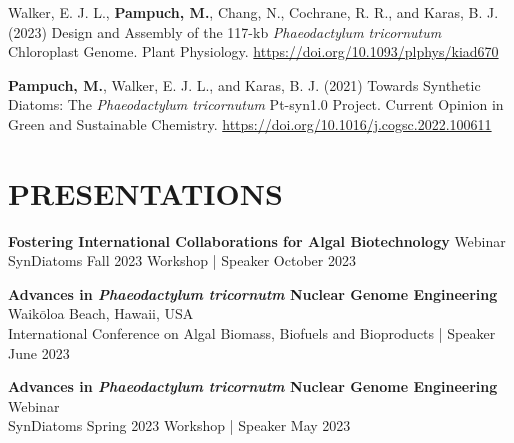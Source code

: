 \documentclass[a4paper,9pt]{extarticle}
\begin{document}
\noindent
\begin{minipage}{1\textwidth}
\setlength{\parindent}{15pt} %
	\noindent
	Walker, E. J. L., \textbf{Pampuch, M.}, Chang, N., Cochrane, R. R., and Karas, B. J. (2023) Design and Assembly of the 117-kb \textit{Phaeodactylum tricornutum} Chloroplast Genome. Plant Physiology. \href{https://doi.org/10.1093/plphys/kiad670}{https://doi.org/10.1093/plphys/kiad670} \\
\end{minipage}

\noindent
\begin{minipage}{1\textwidth}
\setlength{\parindent}{15pt} %
	\noindent
	\textbf{Pampuch, M.}, Walker, E. J. L., and Karas, B. J. (2021) Towards Synthetic Diatoms: The \textit{Phaeodactylum tricornutum} Pt-syn1.0 Project. Current Opinion in Green and Sustainable Chemistry. \href{https://doi.org/10.1016/j.cogsc.2022.100611}{https://doi.org/10.1016/j.cogsc.2022.100611}
\end{minipage}

    
\section*{PRESENTATIONS}
\noindent
\begin{minipage}{1\textwidth}
\setlength{\parindent}{15pt} %
	\noindent
	\textbf{Fostering International Collaborations for Algal Biotechnology}  \hfill Webinar\\ 
	SynDiatoms Fall 2023 Workshop | Speaker  \hfill October 2023\\
\end{minipage}

\noindent
\begin{minipage}{1\textwidth}
\setlength{\parindent}{15pt} %
	\noindent
	\textbf{Advances in \textit{Phaeodactylum tricornutm} Nuclear Genome Engineering}  \hfill Waik$\mathrm{\bar{o}}$loa Beach, Hawaii, USA\\ 
	International Conference on Algal Biomass, Biofuels and Bioproducts | Speaker  \hfill June 2023\\
\end{minipage}

\noindent
\begin{minipage}{1\textwidth}
\setlength{\parindent}{15pt} %
	\noindent
	\textbf{Advances in \textit{Phaeodactylum tricornutm} Nuclear Genome Engineering}  \hfill Webinar\\ 
	SynDiatoms Spring 2023 Workshop | Speaker  \hfill May 2023\\
\end{minipage}
\end{document}
